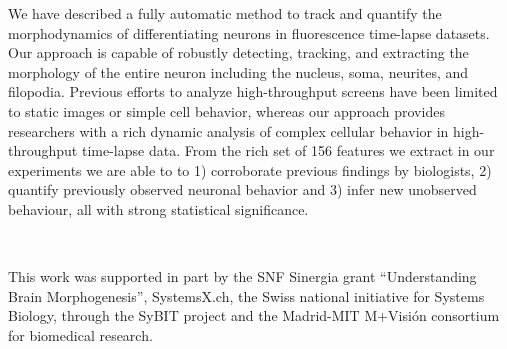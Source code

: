 
We have described a fully automatic method to
track and quantify the morphodynamics of
differentiating neurons in fluorescence time-lapse
datasets.  Our approach is capable of robustly
detecting, tracking, and extracting the morphology
of the entire neuron including the nucleus, soma,
neurites, and filopodia.  Previous efforts to
analyze high-throughput screens have been limited
to static images or simple cell behavior, whereas
our approach provides researchers with a rich
dynamic analysis of complex cellular behavior in
high-throughput time-lapse data.  From the rich
set of 156 features we extract in our experiments
we are able to to 1) corroborate previous findings
by biologists, 2) quantify previously observed
neuronal behavior and 3) infer new unobserved
behaviour, all with strong statistical
significance.  

\vspace{4mm}
\begin{centering}
 \\
\vspace{2mm}
\end{centering}
This work was supported in part by the SNF Sinergia grant
``Understanding Brain Morphogenesis'', SystemsX.ch,
the Swiss national initiative for Systems Biology,
through the SyBIT project and the Madrid-MIT M+Visi\'on consortium 
for biomedical research.











